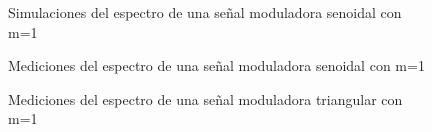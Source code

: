 \documentclass[../../labo_tp5_main.tex]{subfiles}
\begin{document}
\begin{figure}[H]	
	\centering
	\caption{Simulaciones del espectro de una señal moduladora senoidal con m=1}
	\label{fig:ej1_labo_tp5_ej3_b}
\end{figure}
\begin{figure}[H]	
	\centering
	\caption{Mediciones del espectro de una señal moduladora senoidal con m=1}
	\label{fig:ej1_labo_tp5_ej3_b_2}
\end{figure}
\begin{figure}[H]	
	\centering
	\caption{Mediciones del espectro de una señal moduladora triangular con m=1}
	\label{fig:ej1_labo_tp5_ej3_c_1}
\end{figure}
\end{document}
